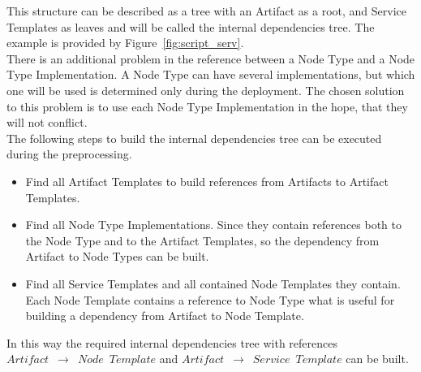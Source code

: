 This structure can be described as a tree with an Artifact as a root, and Service Templates as leaves and will be called the internal dependencies tree.
The example is provided by Figure~\ref{fig:script_serv}.\\
There is an additional problem in the reference between a Node Type and a Node Type Implementation.
A Node Type can have several implementations, but which one will be used is determined only during the deployment. 
The chosen solution to this problem is to use each Node Type Implementation in the hope, that they will not conflict.\\
The following steps to build the internal dependencies tree can be executed during the preprocessing.
\begin{itemize}
	\item Find all Artifact Templates to build references from Artifacts to Artifact Templates.
	\item Find all Node Type Implementations. 
		Since they contain references both to the Node Type and to the Artifact Templates, so the dependency from Artifact to Node Types can be built.
	\item Find all Service Templates and all contained Node Templates they contain. 
		Each Node Template contains a reference to Node Type what is useful for building a dependency from Artifact to Node Template.
\end{itemize} 
In this way the required internal dependencies tree with references \\$Artifact$~$\rightarrow$~$Node$~$Template$ and $Artifact$~$\rightarrow$~$Service$~$Template$ can be built.


